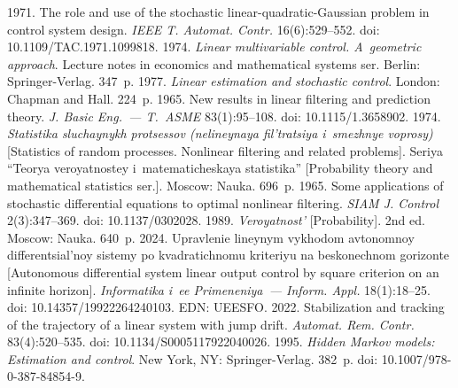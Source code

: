   \begin{multicols}{2}

\renewcommand{\bibname}{\protect\rmfamily References}

{\small\frenchspacing
 {%
 \begin{thebibliography}{99} 
       1971. The role and use of the stochastic linear-quadratic-Gaussian problem in 
control system design. \textit{IEEE T. Automat. Contr.} 16(6):529--552. doi: 
10.1109/TAC.1971.1099818.
       1974. \textit{Linear multivariable control. A~geometric approach}. 
Lecture notes in economics and mathematical systems ser. Berlin: Springer-Verlag. 347~p.
       1977. \textit{Linear estimation and stochastic control}. London: 
Chapman and Hall. 224~p.
       1965. New results in linear filtering and prediction theory. 
\textit{J. Basic Eng.~--- T.~ASME}  83(1):95--108. doi: 10.1115/1.3658902.
     1974. \textit{Statistika sluchaynykh protsessov (nelineynaya 
fil'tratsiya i~smezhnye voprosy)} [Statistics of random processes. Nonlinear filtering and related 
problems]. Seriya ``Teorya ve\-ro\-yat\-no\-stey i~matematicheskaya statistika'' [Probability theory and mathematical statistics ser.]. Moscow: Nauka. 696~p.
       1965. Some applications of stochastic differential equations to optimal 
nonlinear filtering. \textit{SIAM J. Control}  2(3):347--369. doi: 10.1137/0302028.
       1989. \textit{Veroyatnost'} [Probability]. 2nd ed. Moscow: Nauka. 
640~p.
       2024. Upravlenie lineynym vykhodom avtonomnoy differentsial'noy 
sistemy po kvadratichnomu kriteriyu na beskonechnom gorizonte [Autonomous differential system linear 
output control by square criterion on an infinite horizon]. \textit{Informatika i~ee Primeneniya~--- 
Inform. Appl.} 18(1):18--25. doi: 10.14357/19922264240103. EDN: UEESFO.
       2022. Stabilization and tracking of the trajectory of a linear system with 
jump drift. \textit{Automat. Rem. Contr.} 83(4):520--535. doi: 10.1134/S0005117922040026.
       1995. \textit{Hidden Markov models: 
Estimation and control}. New York, NY: Springer-Verlag. 382~p. doi: 10.1007/978-0-387-84854-9.


\end{thebibliography}}}
\end{multicols}
